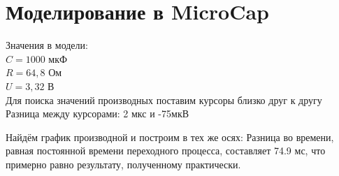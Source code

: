 \section{Моделирование в MicroCap}
Значения в модели:\\
$C= 1000$ мкФ\\
$R= 64,8$ Ом\\
$U= 3,32$ В\\

Для поиска значений производных поставим курсоры близко друг к другу
Разница между курсорами: 2 мкс и -75мкВ


Найдём график производной и построим в тех же осях:
Разница во времени, равная постоянной времени переходного процесса, составляет 74.9 мс, что примерно равно результату, полученному практически.

\endinput